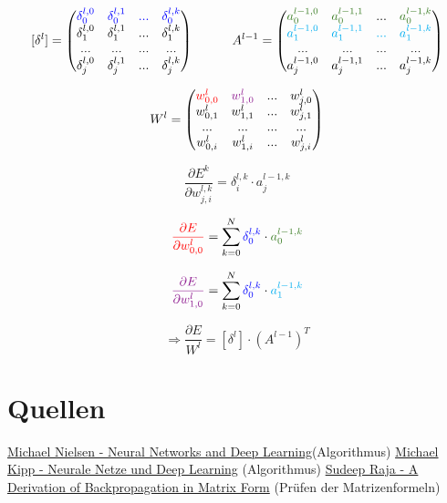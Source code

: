 \documentclass{article}
\begin{document}
 \[ [\delta^l] =
 \begin{pmatrix}
    \textcolor{blue}{\delta_0^{l,0}} & \textcolor{blue}{\delta_0^{l,1}} & \textcolor{blue}{...} & \textcolor{blue}{\delta_0^{l,k}} \\
    \delta_1^{l,0} & \delta_1^{l,1} & ... & \delta_1^{l,k} \\
    ... & ... & ... & ... \\
    \delta_j^{l,0} & \delta_j^{l,1} & ... & \delta_j^{l,k} \\
 \end{pmatrix} 
 \kern 30pt
 A^{l-1} = 
 \begin{pmatrix}
    \textcolor{OliveGreen}{a_0^{l-1,0}} & \textcolor{OliveGreen}{a_0^{l-1,1}} & ... & \textcolor{OliveGreen}{a_0^{l-1,k}} \\
    \textcolor{Cyan}{a_1^{l-1,0}} & \textcolor{Cyan}{a_1^{l-1,1}} & \textcolor{Cyan}{...} & \textcolor{Cyan}{a_1^{l-1,k}} \\
    ... & ... & ... & ... \\
    a_j^{l-1,0} & a_j^{l-1,1} & ... & a_j^{l-1,k} \\
 \end{pmatrix} \]

\[ W^l = \begin{pmatrix}
    \textcolor{red}{w_{0,0}^l} & \textcolor{Plum}{w_{1,0}^l} & ... & w_{j,0}^l \\
    w_{0,1}^l & w_{1,1}^l & ... & w_{j,1}^l \\
    ... & ... & ... & ... \\
    w_{0,i}^l & w_{1,i}^l & ... & w_{j,i}^l
\end{pmatrix} \]



 \[ \frac{\partial E^k}{\partial w_{j,i}^{l,k}} = \delta_i^{l,k} \cdot a_j^{l-1,k} \]

 \[ \textcolor{red}{\frac{\partial E}{\partial w_{0,0}^l}} = 
 \sum_{k = 0}^{N} \textcolor{blue}{\delta_0^{l,k}} \cdot \textcolor{OliveGreen}{a_0^{l-1,k}} \]

  \[ \textcolor{Plum}{\frac{\partial E}{\partial w_{1,0}^l}} = 
 \sum_{k = 0}^{N} \textcolor{blue}{\delta_0^{l,k}} \cdot \textcolor{Cyan}{a_1^{l-1,k}} \]

\[ \Rightarrow \frac{\partial E}{W^l} = [\delta^l] \cdot (A^{l-1})^T \]


\section{Quellen}
\href{http://neuralnetworksanddeeplearning.com}{Michael Nielsen - Neural Networks and Deep Learning}(Algorithmus) \linebreak
\href{https://michaelkipp.de/deeplearning}{Michael Kipp - Neurale Netze und Deep Learning} (Algorithmus) \linebreak
\href{https://sudeepraja.github.io/Neural/}{Sudeep Raja - A Derivation of Backpropagation in Matrix Form} (Prüfen der Matrizenformeln)
\end{document}
